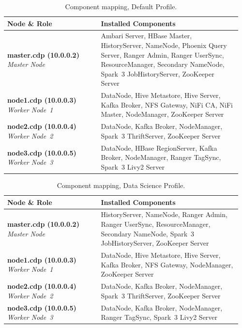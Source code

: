 \begin{table}[htbp]
  \centering
  \caption{Component mapping, Default Profile.}
  \label{tab:comp-default}
  \renewcommand{\arraystretch}{1.2}
  \begin{tabular}{@{} p{0.38\linewidth} p{0.58\linewidth} @{}}
    \hline
    \textbf{Node \& Role} & \textbf{Installed Components} \\
    \hline
    \textbf{master.cdp (10.0.0.2)} \newline \textit{Master Node} & Ambari Server, HBase Master, HistoryServer, NameNode, Phoenix Query Server, Ranger Admin, Ranger UserSync, ResourceManager, Secondary NameNode, Spark~3 JobHistoryServer, ZooKeeper Server \\
    \hline
    \textbf{node1.cdp (10.0.0.3)} \newline \textit{Worker Node~1} & DataNode, Hive Metastore, Hive Server, Kafka Broker, NFS Gateway, NiFi CA, NiFi Master, NodeManager, ZooKeeper Server \\
    \hline
    \textbf{node2.cdp (10.0.0.4)} \newline \textit{Worker Node~2} & DataNode, Kafka Broker, NodeManager, Spark~3 ThriftServer, ZooKeeper Server \\
    \hline
    \textbf{node3.cdp (10.0.0.5)} \newline \textit{Worker Node~3} & DataNode, HBase RegionServer, Kafka Broker, NodeManager, Ranger TagSync, Spark~3 Livy2 Server \\
    \hline
  \end{tabular}
\end{table}

\begin{table}[htbp]
  \centering
  \caption{Component mapping, Data Science Profile.}
  \label{tab:comp-data-science}
  \renewcommand{\arraystretch}{1.2}
  \begin{tabular}{@{} p{0.38\linewidth} p{0.58\linewidth} @{}}
    \hline
    \textbf{Node \& Role} & \textbf{Installed Components} \\
    \hline
    \textbf{master.cdp (10.0.0.2)} \newline \textit{Master Node} & HistoryServer, NameNode, Ranger Admin, Ranger UserSync, ResourceManager, Secondary NameNode, Spark~3 JobHistoryServer, ZooKeeper Server \\
    \hline
    \textbf{node1.cdp (10.0.0.3)} \newline \textit{Worker Node~1} & DataNode, Hive Metastore, Hive Server, Kafka Broker, NFS Gateway, NodeManager, ZooKeeper Server \\
    \hline
    \textbf{node2.cdp (10.0.0.4)} \newline \textit{Worker Node~2} & DataNode, Kafka Broker, NodeManager, Spark~3 ThriftServer, ZooKeeper Server \\
    \hline
    \textbf{node3.cdp (10.0.0.5)} \newline \textit{Worker Node~3} & DataNode, Kafka Broker, NodeManager, Ranger TagSync, Spark~3 Livy2 Server \\
    \hline
  \end{tabular}
\end{table}
